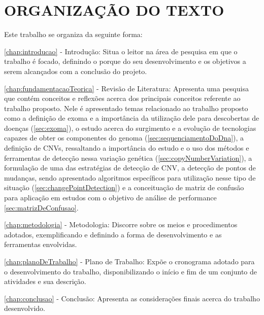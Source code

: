 \section{ORGANIZAÇÃO DO TEXTO}

Este trabalho se organiza da seguinte forma: 

\autoref{chap:introducao} - Introdução: Situa o leitor na área de pesquisa em que o trabalho é focado, definindo o porque do seu desenvolvimento e os objetivos a serem alcançados com a conclusão do projeto. 

\autoref{chap:fundamentacaoTeorica} - Revisão de Literatura: Apresenta uma pesquisa que contém conceitos e reflexões acerca dos principais conceitos referente ao trabalho proposto. Nele é apresentado temas relacionado ao trabalho proposto como a definição de exoma e a importância da utilização dele para descobertas de doenças (\autoref{sec:exoma}), o estudo acerca do surgimento e a evolução de tecnologias capazes de obter os componentes do genoma (\autoref{sec:sequenciamentoDoDna}), a definição de CNVs, ressaltando a importância do estudo e o uso dos métodos e ferramentas de detecção nessa variação genética (\autoref{sec:copyNumberVariation}), a formulação de uma das estratégias de detecção de CNV, a detecção de pontos de mudanças, sendo apresentado algoritmos específicos para utilização nesse tipo de situação (\autoref{sec:changePointDetection}) e a conceituação de matriz de confusão para aplicação em estudos com o objetivo de análise de performance \autoref{sec:matrizDeConfusao}. 

\autoref{chap:metodologia} - Metodologia: Discorre sobre os meios e procedimentos adotados, exemplificando e definindo a forma de desenvolvimento e as ferramentas envolvidas. 

\autoref{chap:planoDeTrabalho} - Plano de Trabalho: Expõe o cronograma adotado para o desenvolvimento do trabalho, disponibilizando o início e fim de um conjunto de atividades e sua descrição. 

\autoref{chap:conclusao} - Conclusão: Apresenta as considerações finais acerca do trabalho desenvolvido.